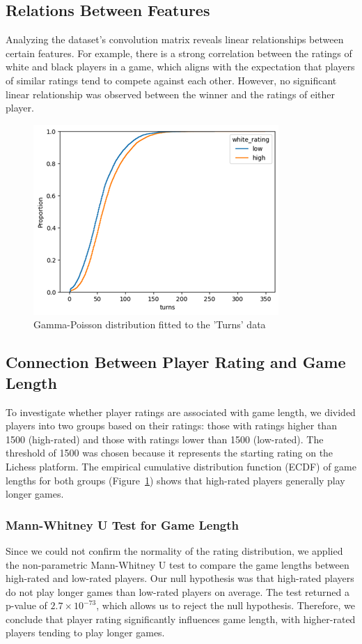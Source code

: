 \documentclass[conference]{IEEEtran}
\begin{document}
\subsection{Relations Between Features}
Analyzing the dataset’s convolution matrix reveals linear relationships between certain features. For example, there is a strong correlation between the ratings of white and black players in a game, which aligns with the expectation that players of similar ratings tend to compete against each other. However, no significant linear relationship was observed between the winner and the ratings of either player.

\begin{figure}[H]
    \centering
    \includegraphics[width=0.8\linewidth]{ratingecdf.png}
    \caption{Gamma-Poisson distribution fitted to the 'Turns' data}
    \label{fig:ecdf_plot}
\end{figure}

\subsection{Connection Between Player Rating and Game Length}
To investigate whether player ratings are associated with game length, we divided players into two groups based on their ratings: those with ratings higher than 1500 (high-rated) and those with ratings lower than 1500 (low-rated). The threshold of 1500 was chosen because it represents the starting rating on the Lichess platform. The empirical cumulative distribution function (ECDF) of game lengths for both groups (Figure~\ref{fig:ecdf_plot}) shows that high-rated players generally play longer games.

\subsubsection*{Mann-Whitney U Test for Game Length}
Since we could not confirm the normality of the rating distribution, we applied the non-parametric Mann-Whitney U test to compare the game lengths between high-rated and low-rated players. Our null hypothesis was that high-rated players do not play longer games than low-rated players on average. The test returned a p-value of \(2.7 \times 10^{-73}\), which allows us to reject the null hypothesis. Therefore, we conclude that player rating significantly influences game length, with higher-rated players tending to play longer games.
\end{document}
